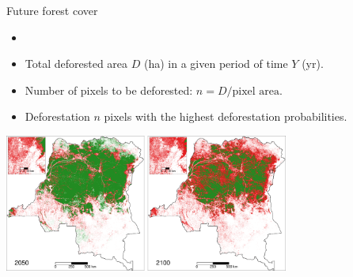 \documentclass[10pt,table,dvipsnames,compress]{beamer}
\begin{document}
\begin{frame}[label={sec:orgad5bffc}]{Future forest cover}
\begin{itemize}
\item {}
\item Total deforested area \(D\) (ha) in a given period of time \(Y\) (yr).
\item Number of pixels to be deforested: \(n=D/\text{pixel area}\).
\item Deforestation \(n\) pixels with the highest deforestation probabilities.
\end{itemize}

\centering \includegraphics[width=0.7\textwidth]{figs/sm/fcc2050_2100.png}

\end{frame}
\end{document}
